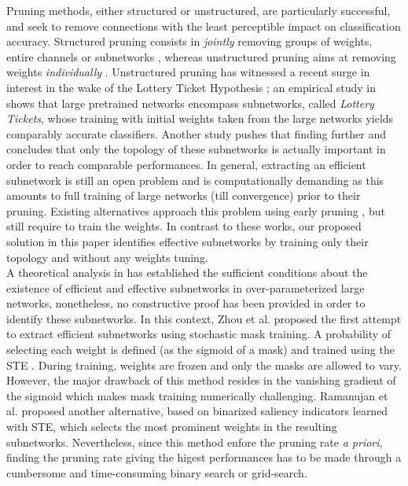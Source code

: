 Pruning methods, either structured or unstructured, are particularly successful,
and seek to remove connections with the least perceptible impact on
classification accuracy. Structured pruning consists in {\it jointly} removing
groups of weights, entire channels or subnetworks
\cite{DBLP:conf/iclr/0022KDSG17, DBLP:conf/iccv/LiuLSHYZ17}, whereas
unstructured pruning aims at removing weights {\it individually}
\cite{DBLP:conf/nips/HanPTD15,DBLP:journals/corr/HanMD15}.  Unstructured pruning
has witnessed a recent surge in interest in the wake of the Lottery Ticket
Hypothesis  \cite{DBLP:conf/iclr/FrankleC19}; an empirical study in
\cite{DBLP:conf/iclr/FrankleC19} shows that large pretrained networks encompass
subnetworks, called \textit{Lottery Tickets}, whose training with initial
weights taken from the large networks yields comparably accurate classifiers.
Another study \cite{DBLP:conf/iclr/LiuSZHD19} pushes that finding further and
concludes that only the topology of these subnetworks is actually important in
order to reach comparable performances.  In general, extracting an efficient
subnetwork is still an open problem and is computationally demanding as this
amounts to full training of large networks (till convergence) prior to their
pruning. Existing alternatives approach this problem using early pruning
\cite{DBLP:conf/iclr/LeeAT19,
DBLP:conf/iclr/WangZG20,DBLP:conf/nips/TanakaKYG20}, but still require to train
the weights. In contrast to these works, our proposed solution in this paper
identifies effective subnetworks by training only their topology and without any
weights tuning.\\ 

A theoretical analysis in
\cite{DBLP:conf/icml/MalachYSS20,DBLP:conf/nips/PensiaRNVP20,DBLP:conf/nips/OrseauHR20}
has established the sufficient conditions about the existence of efficient and
effective subnetworks in over-parameterized large networks, nonetheless, no
constructive proof has been provided in order to identify these subnetworks. In
this context, Zhou et al. \cite{DBLP:conf/nips/ZhouLLY19} proposed the first
attempt to extract efficient subnetworks using stochastic mask training. A
probability of selecting each weight is defined (as the sigmoid of a mask) and
trained using the \ac{STE} \cite{DBLP:journals/corr/BengioLC13}. During
training, weights are frozen and only the masks are allowed to vary. However,
the major drawback of this method resides in the vanishing gradient of the
sigmoid which makes mask training numerically challenging. Ramanujan et al.
\cite{DBLP:conf/cvpr/RamanujanWKFR20} proposed another alternative, based on
binarized saliency indicators learned with \ac{STE}, which selects the most
prominent weights in the resulting subnetworks. Nevertheless, since this method
enfore the pruning rate \textit{a priori}, finding the pruning rate giving the
higest performances has to be made through a cumbersome and time-consuming
binary search or grid-search. \\ 

